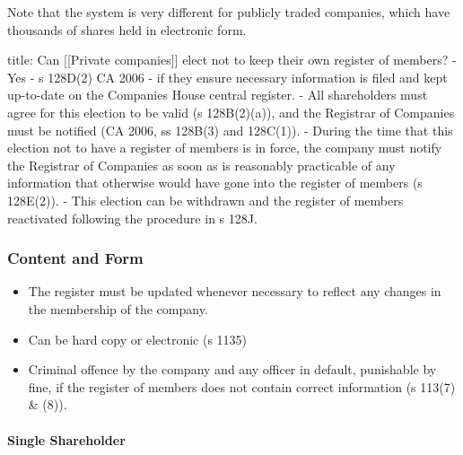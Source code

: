 \documentclass[
]{article}
\newenvironment{Shaded}{}{}
\newcommand{\NormalTok}[1]{#1}
\providecommand{\tightlist}{%
  \setlength{\itemsep}{0pt}\setlength{\parskip}{0pt}}
\begin{document}
Note that the system is very different for publicly traded companies,
which have thousands of shares held in electronic form.

\begin{Shaded}
\begin{Highlighting}[]
\NormalTok{title: Can [[Private companies]] elect not to keep their own register of members?}
\NormalTok{{-} Yes {-} s 128D(2) CA 2006 {-} if they ensure necessary information is filed and kept up{-}to{-}date on the Companies House central register. }
\NormalTok{{-} All shareholders must agree for this election to be valid (s 128B(2)(a)), and the Registrar of Companies must be notified (CA 2006, ss 128B(3) and 128C(1)). }
\NormalTok{{-} During the time that this election not to have a register of members is in force, the company must notify the Registrar of Companies as soon as is reasonably practicable of any information that otherwise would have gone into the register of members (s 128E(2)). }
\NormalTok{{-} This election can be withdrawn and the register of members reactivated following the procedure in s 128J.}
\end{Highlighting}
\end{Shaded}

\hypertarget{content-and-form}{%
\subsubsection{Content and Form}\label{content-and-form}}

\begin{itemize}
\tightlist
\item
  The register must be updated whenever necessary to reflect any changes
  in the membership of the company.
\item
  Can be hard copy or electronic (s 1135)
\item
  Criminal offence by the company and any officer in default, punishable
  by fine, if the register of members does not contain correct
  information (s 113(7) \& (8)).
\end{itemize}

\hypertarget{single-shareholder}{%
\paragraph{Single Shareholder}\label{single-shareholder}}
\end{document}
